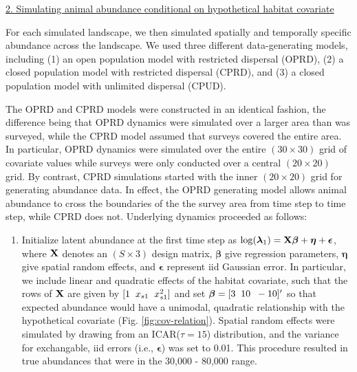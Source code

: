 \documentclass[12pt,fleqn]{article}
\begin{document}
\begin{flushleft}
\underline{2. Simulating animal abundance conditional on hypothetical habitat covariate}

For each simulated landscape, we then simulated spatially and temporally specific abundance across the landscape.  We used three different data-generating models, including (1) an open population model with restricted dispersal (OPRD), (2) a closed population model with restricted dispersal (CPRD), and (3) a closed population model with unlimited dispersal (CPUD).

\hspace{.5in} The OPRD and CPRD models were constructed in an identical fashion, the difference being that OPRD dynamics were simulated over a larger area than was surveyed, while the CPRD model assumed that surveys covered the entire area.  In particular, OPRD dynamics were simulated over the entire $(30 \times 30)$ grid of covariate values while surveys were only conducted over a central $(20 \times 20)$ grid.  By contrast, CPRD simulations started with the inner $(20 \times 20)$ grid for generating abundance data.  In effect, the OPRD generating model allows animal abundance to cross the boundaries of the the survey area from time step to time step, while CPRD does not.  Underlying dynamics proceeded as follows:
\begin{enumerate}
\renewcommand{\theenumi}{\Alph{enumi}} %
  \item Initialize latent abundance at the first time step as
   $\log(\boldsymbol{\lambda}_1) = {\bf X} \boldsymbol{\beta} + \boldsymbol{\eta} + \boldsymbol{\epsilon}$,
   where ${\bf X}$ denotes an $(S \times 3)$ design matrix, $\boldsymbol{\beta}$ give regression parameters, $\boldsymbol{\eta}$ give spatial random effects, and $\boldsymbol{\epsilon}$ represent iid Gaussian error.  In particular, we include linear and quadratic effects of the habitat covariate, such that the rows of ${\bf X}$ are given by $[1 \hspace{2mm} x_{s1} \hspace{2mm} x_{s1}^2]$ and set $\boldsymbol{\beta} = [3 \hspace{2mm} 10 \hspace{2mm} -10]^\prime$ so that expected abundance would have a unimodal, quadratic relationship with the hypothetical covariate (Fig. \ref{fig:cov-relation}).  Spatial random effects were simulated by drawing from an ICAR($\tau=15$) distribution, and the variance for exchangable, iid errors (i.e., $\boldsymbol{\epsilon}$) was set to 0.01. This procedure resulted in true abundances that were in the 30,000 - 80,000 range.\\

\end{enumerate}
\end{flushleft}
\end{document}
